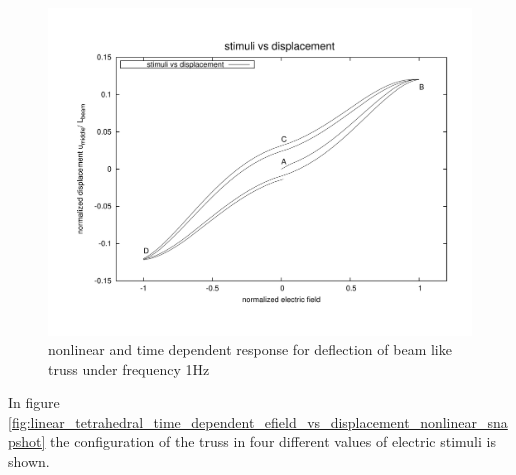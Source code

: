 \begin{figure}  
\centering
\includegraphics[width=5.0in]{./chap_5_active_trusses/images_non_linear_time_dependent_constitutive_equatio/linear_tetrahedral_time_dependent_efield_vs_displacement_nonlinear.pdf}
\caption{nonlinear and time dependent response for deflection of beam like truss under frequency 1Hz}
\label{fig:linear_tetrahedral_time_dependent_efield_vs_displacement_nonlinear}
\end{figure} 

In figure \ref{fig:linear_tetrahedral_time_dependent_efield_vs_displacement_nonlinear_snapshot} the configuration of the truss in four different values of electric stimuli is shown.


